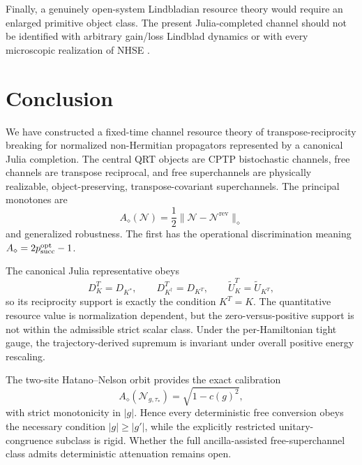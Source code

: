 \documentclass[reprint,amsmath,amssymb,aps,nofootinbib]{revtex4-2}
\newcommand{\rev}{\mathrm{rev}}
\begin{document}
Finally, a genuinely open-system Lindbladian resource theory would require an enlarged primitive
object class. The present Julia-completed channel should not be identified with arbitrary gain/loss
Lindblad dynamics or with every microscopic realization of NHSE
\cite{ChaduteauLindblad2026}.

\section{Conclusion}
\label{sec:conclusion}

We have constructed a fixed-time channel resource theory of transpose-reciprocity breaking for
normalized non-Hermitian propagators represented by a canonical Julia completion. The central QRT
objects are CPTP bistochastic channels, free channels are transpose reciprocal, and free
superchannels are physically realizable, object-preserving, transpose-covariant superchannels.
The principal monotones are
\begin{equation}
A_\diamond(\mathcal N)=\frac12\|\mathcal N-\mathcal N^{\rev}\|_\diamond
\end{equation}
and generalized robustness. The first has the operational discrimination meaning
$A_\diamond=2p_{\rm succ}^{\rm opt}-1$.

The canonical Julia representative obeys
\begin{equation}
D_K^T=D_{K^*},
\qquad
D_{K^\dagger}^T=D_{K^T},
\qquad
\widetilde U_K^T=\widetilde U_{K^T},
\end{equation}
so its reciprocity support is exactly the condition $K^T=K$. The quantitative resource value is
normalization dependent, but the zero-versus-positive support is not within the admissible strict
scalar class. Under the per-Hamiltonian tight gauge, the trajectory-derived supremum is invariant
under overall positive energy rescaling.

The two-site Hatano--Nelson orbit provides the exact calibration
\begin{equation}
A_\diamond(\mathcal N_{g,\tau_*})=\sqrt{1-c(g)^2},
\end{equation}
with strict monotonicity in $|g|$. Hence every deterministic free conversion obeys the necessary
condition $|g|\ge|g'|$, while the explicitly restricted unitary-congruence subclass is rigid.
Whether the full ancilla-assisted free-superchannel class admits deterministic attenuation remains
open.
\end{document}
